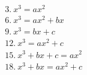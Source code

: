 \documentclass[preview]{standalone}
\begin{document}
\begin{align*}
&3.\ x^3=ax^2\\ &6.\ x^3=ax^2+bx \\ &9.\ x^3=bx+c \\ &12.\ x^3=ax^2+c \\ &15.\ x^3+bx+c=ax^2 \\ &18.\ x^3+bx=ax^2+c
\end{align*}
\end{document}
